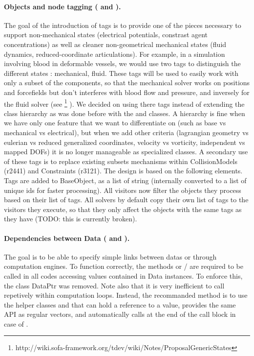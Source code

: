 \begin{itemize}
\begin{itemize}
\paragraph{Objects and node tagging ( and ).}
The goal of the introduction of tags is to provide one of the pieces necessary to support non-mechanical states (electrical potentials, constrast agent concentrations) as well as cleaner non-geometrical mechanical states (fluid dynamics, reduced-coordinate articulations).
For example, in a simulation involving blood in deformable vessels, we would use two tags to distinguish the different states : mechanical, fluid.
These tags will be used to easily work with only a subset of the components, so that the mechanical solver works on positions and forcefields but don't interferes with blood flow and pressure, and inversely for the fluid solver (see \footnote{http://wiki.sofa-framework.org/tdev/wiki/Notes/ProposalGenericStates} ).
We decided on using there tags instead of extending the class hierarchy as was done before with the  and  classes.
A hierarchy is fine when we have only one feature that we want to differentiate on (such as base vs mechanical vs electrical), but when we add other criteria (lagrangian geometry vs eulerian vs reduced generalized coordinates, velocity vs vorticity, independent vs mapped DOFs) it is no longer manageable as specialized classes.
A secondary use of these tags is to replace existing subsets mechanisms within CollisionModels (r2441) and Constraints (r3121).
The design is based on the following elements.
Tags are added to BaseObject, as a list of string (internally converted to a list of unique ids for faster processing).
All visitors now filter the objects they process based on their list of tags.
All solvers by default copy their own list of tags to the visitors they execute, so that they only affect the objects with the same tags as they have (TODO: this is currently broken). 


\paragraph{Dependencies between Data ( and ).}
The goal is to be able to specify simple links between datas or through computation engines.
To function correctly, the methods  or / are required to be called in all codes accessing values contained in Data instances.
To enforce this, the class DataPtr was removed.
Note also that it is very inefficient to call  repetively within computation loops.
Instead, the recommanded method is to use the helper classes  and 
that can hold a reference to a  value, provides the same API as regular vectors,
and automatically calls  at the end of the call block in case of .


\end{itemize}
\end{itemize}
